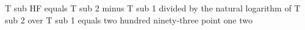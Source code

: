 T sub HF equals T sub 2 minus T sub 1 divided by the natural logarithm of T sub 2 over T sub 1 equals two hundred ninety-three point one two